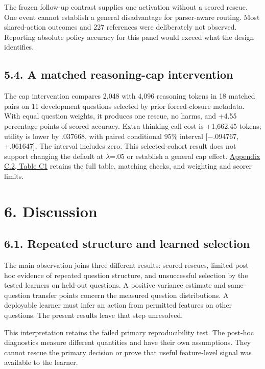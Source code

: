 \documentclass[11pt,a4paper]{article}
\begin{document}
The frozen follow-up contrast supplies one activation without a scored rescue. One event cannot establish a general disadvantage for parser-aware routing. Most shared-action outcomes and 227 references were deliberately not observed. Reporting absolute policy accuracy for this panel would exceed what the design identifies.

\subsection*{5.4. A matched reasoning-cap intervention}\label{sec:54-a-matched-reasoning-cap-intervention}
The cap intervention compares 2,048 with 4,096 reasoning tokens in 18 matched pairs on 11 development questions selected by prior forced-closure metadata. With equal question weights, it produces one rescue, no harms, and +4.55 percentage points of scored accuracy. Extra thinking-call cost is +1,662.45 tokens; utility is lower by .037668, with paired conditional 95\% interval [\ensuremath{-}.094767, +.061647]. The interval includes zero. This selected-cohort result does not support changing the default at \ensuremath{\lambda}=.05 or establish a general cap effect. \hyperref[sec:c2-matched-cap-results]{Appendix C.2, Table C1} retains the full table, matching checks, and weighting and scorer limits.

\section*{6. Discussion}\label{sec:6-discussion}
\subsection*{6.1. Repeated structure and learned selection}\label{sec:61-repeated-structure-and-learned-selection}
The main observation joins three different results: scored rescues, limited post-hoc evidence of repeated question structure, and unsuccessful selection by the tested learners on held-out questions. A positive variance estimate and same-question transfer points concern the measured question distributions. A deployable learner must infer an action from permitted features on other questions. The present results leave that step unresolved.

This interpretation retains the failed primary reproducibility test. The post-hoc diagnostics measure different quantities and have their own assumptions. They cannot rescue the primary decision or prove that useful feature-level signal was available to the learner.
\end{document}
